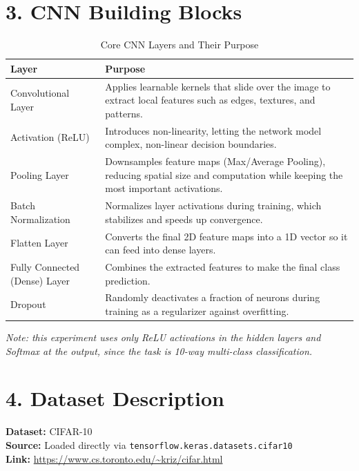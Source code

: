 \documentclass[11pt]{article}
\begin{document}

\section*{3. CNN Building Blocks}

\begin{table}[H]
\centering
\caption{Core CNN Layers and Their Purpose}
\begin{tabular}{p{3.3cm}p{10.5cm}}
\toprule
\textbf{Layer} & \textbf{Purpose} \\
\midrule
Convolutional Layer & Applies learnable kernels that slide over the image to extract local features such as edges, textures, and patterns. \\
Activation (ReLU) & Introduces non-linearity, letting the network model complex, non-linear decision boundaries. \\
Pooling Layer & Downsamples feature maps (Max/Average Pooling), reducing spatial size and computation while keeping the most important activations. \\
Batch Normalization & Normalizes layer activations during training, which stabilizes and speeds up convergence. \\
Flatten Layer & Converts the final 2D feature maps into a 1D vector so it can feed into dense layers. \\
Fully Connected (Dense) Layer & Combines the extracted features to make the final class prediction. \\
Dropout & Randomly deactivates a fraction of neurons during training as a regularizer against overfitting. \\
\bottomrule
\end{tabular}
\end{table}

\textit{Note: this experiment uses only ReLU activations in the hidden layers and Softmax at the output, since the task is 10-way multi-class classification.}


\section*{4. Dataset Description}

\textbf{Dataset:} CIFAR-10\\
\textbf{Source:} Loaded directly via \texttt{tensorflow.keras.datasets.cifar10}\\
\textbf{Link:} \url{https://www.cs.toronto.edu/~kriz/cifar.html}
\end{document}
